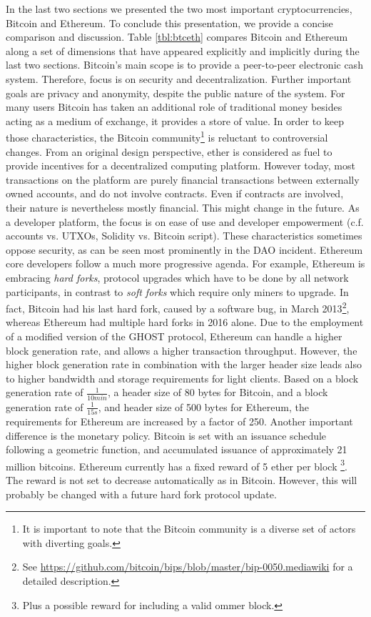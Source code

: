 In the last two sections we presented the two most important cryptocurrencies, Bitcoin and Ethereum. 
To conclude this presentation, we provide a concise comparison and discussion. Table \ref{tbl:btceth} compares Bitcoin and Ethereum along a set of dimensions that have appeared explicitly and implicitly during the last two sections. Bitcoin's main scope is to provide a peer-to-peer electronic cash system. Therefore, focus is on security and decentralization. Further important goals are privacy and anonymity, despite the public nature of the system. For many users Bitcoin has taken an additional role of traditional money besides acting as a medium of exchange, it provides a store of value. In order to keep those characteristics, the Bitcoin community\footnote{It is important to note that the Bitcoin community is a diverse set of actors with diverting goals.} is reluctant to controversial changes. From an original design perspective, ether is considered as fuel to provide incentives for a decentralized computing platform. However today, most transactions on the platform are purely financial transactions between externally owned accounts, and do not involve contracts. Even if contracts are involved, their nature is nevertheless mostly financial. This might change in the future. As a developer platform, the focus is on ease of use and developer empowerment (c.f. accounts vs. \ac{UTXO}s, Solidity vs. Bitcoin script). These characteristics sometimes oppose security, as can be seen most prominently in the DAO incident. Ethereum core developers follow a much more progressive agenda. For example, Ethereum is embracing \emph{hard forks}, protocol upgrades which have to be done by all network participants, in contrast to \emph{soft forks} which require only miners to upgrade. In fact, Bitcoin had his last hard fork, caused by a software bug, in March 2013\footnote{See \url{https://github.com/bitcoin/bips/blob/master/bip-0050.mediawiki} for a detailed description.}, whereas Ethereum had multiple hard forks in 2016 alone. 
Due to the employment of a modified version of the \ac{GHOST} protocol, Ethereum can handle a higher block generation rate, and allows a higher transaction throughput. However, the higher block generation rate in combination with the larger header size leads also to higher bandwidth and storage requirements for light clients. Based on a block generation rate of $\frac{1}{10 min}$, a header size of 80 bytes for Bitcoin, and a block generation rate of $\frac{1}{15 s}$, and header size of 500 bytes for Ethereum, the requirements for Ethereum are increased by a factor of 250. Another important difference is the monetary policy. Bitcoin is set with an issuance schedule following a geometric function, and accumulated issuance of approximately 21 million bitcoins. Ethereum currently has a fixed reward of 5 ether per block \parencite{ethmining}\footnote{Plus a possible reward for including a valid ommer block.}. The reward is not set to decrease automatically as in Bitcoin. However, this will probably be changed with a future hard fork protocol update. 

